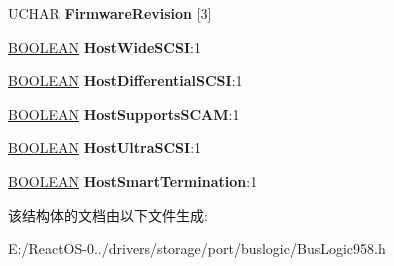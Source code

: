 \begin{DoxyCompactItemize}
\begin{tabbing}
\end{tabbing}\item 
\mbox{\label{struct_bus_logic___extended_setup_information_a560e71355d637c6f75c6a5db5d725544}} 
U\+C\+H\+AR {\bfseries Firmware\+Revision} \mbox{[}3\mbox{]}
\item 
\mbox{\label{struct_bus_logic___extended_setup_information_aef00d040abf56f2f49f35fdf4721da52}} 
\hyperlink{_processor_bind_8h_a112e3146cb38b6ee95e64d85842e380a}{B\+O\+O\+L\+E\+AN} {\bfseries Host\+Wide\+S\+C\+SI}\+:1
\item 
\mbox{\label{struct_bus_logic___extended_setup_information_a780bdb758b94d783401830f8687730ed}} 
\hyperlink{_processor_bind_8h_a112e3146cb38b6ee95e64d85842e380a}{B\+O\+O\+L\+E\+AN} {\bfseries Host\+Differential\+S\+C\+SI}\+:1
\item 
\mbox{\label{struct_bus_logic___extended_setup_information_a0b265d22e8136837ee8218c336a27dfe}} 
\hyperlink{_processor_bind_8h_a112e3146cb38b6ee95e64d85842e380a}{B\+O\+O\+L\+E\+AN} {\bfseries Host\+Supports\+S\+C\+AM}\+:1
\item 
\mbox{\label{struct_bus_logic___extended_setup_information_aebf052c3463e1650da0191061e462143}} 
\hyperlink{_processor_bind_8h_a112e3146cb38b6ee95e64d85842e380a}{B\+O\+O\+L\+E\+AN} {\bfseries Host\+Ultra\+S\+C\+SI}\+:1
\item 
\mbox{\label{struct_bus_logic___extended_setup_information_af2e0a0336c442122ff9e499587ce6d2b}} 
\hyperlink{_processor_bind_8h_a112e3146cb38b6ee95e64d85842e380a}{B\+O\+O\+L\+E\+AN} {\bfseries Host\+Smart\+Termination}\+:1
\end{DoxyCompactItemize}


该结构体的文档由以下文件生成\+:\begin{DoxyCompactItemize}
\item 
E\+:/\+React\+O\+S-\/0../drivers/storage/port/buslogic/Bus\+Logic958.\+h\end{DoxyCompactItemize}

